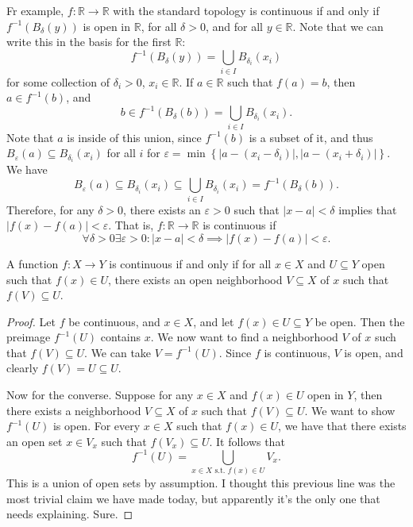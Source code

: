 Fr example, $f : \mathbb{R}  \to \mathbb{R} $ with the standard topology is continuous if and only if $f^{-1} (B_\delta (y))$ is open in $\mathbb{R} $, for all $\delta >0$, and for all $y\in \mathbb{R} $. Note that we can write this in the basis for the first $\mathbb{R} $:
\[
	f^{-1}(B_\delta (y))=\bigcup_{i\in I} B_{\delta_i} (x_i)
\]
for some collection of $\delta_i>0$, $x_i\in\mathbb{R} $. If $a\in\mathbb{R} $ such that $f(a)=b$, then $a\in f^{-1} (b)$, and
\[
	b\in f^{-1} (B_\delta (b))=\bigcup_{i\in I} B_{\delta _i} (x_i)
.\]
Note that $a$ is inside of this union, since $f^{-1} (b)$ is a subset of it, and thus $B_{\varepsilon } (a)\subseteq B_{\delta _i} (x_i)$ for all $i$ for $\varepsilon =\min \left\{ \left| a-(x_i-\delta _i)		 \right| ,\left| a-(x_i+\delta _i) \right|  \right\} $. We have
\[
	B_{\varepsilon } (a)\subseteq B_{\delta _i} (x_i)\subseteq \bigcup_{i\in I} B_{\delta _i} (x_i)=f^{-1} (B_{\delta } (b))
.\]
Therefore, for any $\delta >0$, there exists an $\varepsilon >0$ such that $\left| x-a \right| <\delta $ implies that $\left| f(x)-f(a) \right| <\varepsilon $. That is, $f : \mathbb{R}  \to \mathbb{R} $ is continuous if
\[
	\forall \delta >0\exists \varepsilon >0 : \left| x-a \right| <\delta \implies \left| f(x)-f(a) \right| <\varepsilon 
.\]

\begin{theorem}\label{thm:2.2}
	A function $f : X \to Y$ is continuous if and only if for all $x\in X$ and $U\subseteq Y$ open such that $f(x)\in U$, there exists an open neighborhood $V\subseteq X$ of $x$ such that $f(V)\subseteq U$.
\end{theorem}
\begin{proof}
	Let $f$ be continuous, and $x\in X$, and let $f(x)\in U\subseteq Y$ be open. Then the preimage $f^{-1} (U)$ contains $x$. We now want to find a neighborhood $V$ of $x$ such that $f(V)\subseteq U$. We can take $V=f^{-1} (U)$. Since $f$ is continuous, $V$ is open, and clearly $f(V)=U\subseteq U$.

	Now for the converse. Suppose for any $x\in X$ and $f(x)\in U$ open in $Y$, then there exists a neighborhood $V\subseteq X$ of $x$ such that $f(V)\subseteq U$. We want to show $f^{-1} (U)$ is open. For every $x\in X$ such that $f(x)\in U$, we have that there exists an open set $x\in V_x$ such that $f(V_x)\subseteq U$. It follows that
	\[
		f^{-1} (U)=\bigcup_{x\in X\text{ s.t. } f(x)\in U} V_x
	.\]
	This is a union of open sets by assumption. I thought this previous line was the most trivial claim we have made today, but apparently it's the only one that needs explaining. Sure.
\end{proof}


